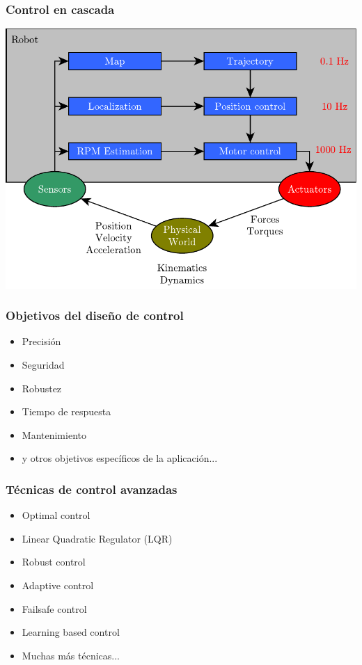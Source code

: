 \begin{frame}
    \frametitle{Control en cascada}
    
    \begin{center}
        \includegraphics[width=0.7\columnwidth]{./images/control_architecture_phrequency.pdf}
    \end{center}
    
\end{frame}

\begin{frame}
    \frametitle{Objetivos del diseño de control}
    
    \begin{itemize}
        \item Precisión
        \item Seguridad
        \item Robustez
        \item Tiempo de respuesta
        \item Mantenimiento
        \item y otros objetivos específicos de la aplicación...
    \end{itemize}
    
\end{frame}


\begin{frame}
    \frametitle{Técnicas de control avanzadas}
    
    \begin{itemize}
        \item Optimal control
        \item Linear Quadratic Regulator (LQR)
        \item Robust control
        \item Adaptive control
        \item Failsafe control
        \item Learning based control
        \item Muchas más técnicas...
    \end{itemize}
    
\end{frame}

